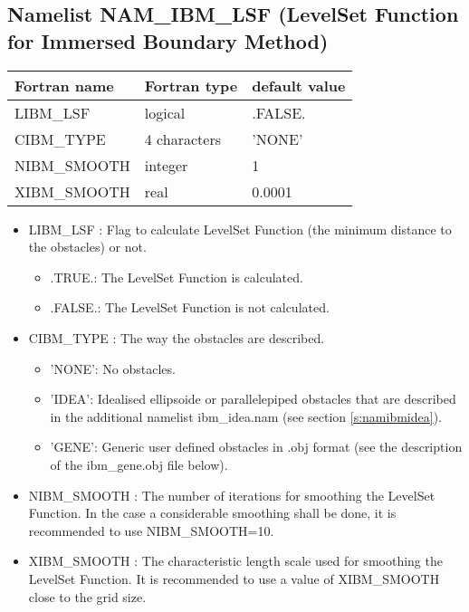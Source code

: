 \subsection{Namelist NAM\_IBM\_LSF (LevelSet Function for Immersed Boundary Method)}
\label{s:namibmlsf}
\begin{center}
\begin{tabular} {|l|l|l|}
\hline
Fortran name  & Fortran type  & default value \\
\hline
LIBM\_LSF     & logical       & .FALSE.       \\
CIBM\_TYPE    & 4 characters  & 'NONE'        \\
NIBM\_SMOOTH  & integer       & 1             \\
XIBM\_SMOOTH  & real          & 0.0001        \\
\hline
\end{tabular}
\end{center}

\begin{itemize}

\item LIBM\_LSF  : Flag to
  calculate LevelSet Function (the minimum distance to the obstacles) or not.
\begin{itemize}
\item .TRUE.: The LevelSet Function is calculated.
\item .FALSE.: The LevelSet Function is not calculated.
\end{itemize}

\item CIBM\_TYPE  : The way the
  obstacles are described.
\begin{itemize}
\item 'NONE': No obstacles.
\item 'IDEA': Idealised ellipsoide or parallelepiped obstacles that
  are described in the additional namelist ibm\_idea.nam (see section \ref{s:namibmidea}).
\item 'GENE': Generic user defined obstacles in .obj format (see the description of the ibm\_gene.obj file below).
\end{itemize}

\item NIBM\_SMOOTH  : The
  number of iterations for smoothing the LevelSet Function. In the
  case a considerable smoothing shall be done, it is recommended to use NIBM\_SMOOTH=10.

\item XIBM\_SMOOTH  : The
  characteristic length scale used for smoothing the LevelSet
  Function. It is recommended to use a value of XIBM\_SMOOTH close to the grid size.

\end{itemize}

